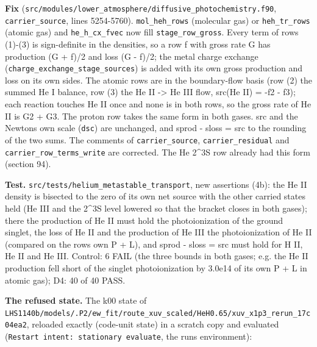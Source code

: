 \documentclass[english,a4paper]{my_memo}
\begin{document}
\textbf{Fix} (\texttt{src/modules/lower\_atmosphere/diffusive\_photochemistry.f90},
\texttt{carrier\_source}, lines 5254-5760). \texttt{mol\_heh\_rows} (molecular gas) or
\texttt{heh\_tr\_rows} (atomic gas) and \texttt{he\_h\_cx\_fvec} now fill \texttt{stage\_row\_gross}.
Every term of rows (1)-(3) is sign-definite in the densities, so a row f with
gross rate G has production (G + f)/2 and loss (G - f)/2; the metal charge
exchange (\texttt{charge\_exchange\_stage\_sources}) is added with its own gross
production and loss on its own sides. The atomic rows are in the
boundary-flow basis (row (2) the summed He I balance, row (3) the He II -\textgreater{}
He III flow, src(He II) = -f2 - f3); each reaction touches He II once and
none is in both rows, so the gross rate of He II is G2 + G3. The proton row
takes the same form in both gases. src and the Newton\textquotesingle s own scale (\texttt{dsc}) are
unchanged, and sprod - sloss = src to the rounding of the two sums. The
comments of \texttt{carrier\_source}, \texttt{carrier\_residual} and
\texttt{carrier\_row\_terms\_write} are corrected. The He 2\^{}3S row already had this
form (section 94).

\textbf{Test.} \texttt{src/tests/helium\_metastable\_transport}, new assertions (4b): the
He II density is bisected to the zero of its own net source with the other
carried states held (He III and the 2\^{}3S level lowered so that the bracket
closes in both gases); there the production of He II must hold the
photoionization of the ground singlet, the loss of He II and the production
of He III the photoionization of He II (compared on the row\textquotesingle s own P + L), and
sprod - sloss = src must hold for H II, He II and He III. Control: 6 FAIL
(the three bounds in both gases; e.g. the He II production fell short of the
singlet photoionization by 3.0e14 of its own P + L in atomic gas); D4: 40 of
40 PASS.

\textbf{The refused state.} The k00 state of
\texttt{LHS1140b/models/.P2/ew\_fit/route\_xuv\_scaled/HeH0.65/xuv\_x1p3\_rerun\_17c04ea2},
reloaded exactly (code-unit state) in a scratch copy and evaluated
(\texttt{Restart\ intent:\ stationary\ evaluate}, the run\textquotesingle s environment):
\end{document}

